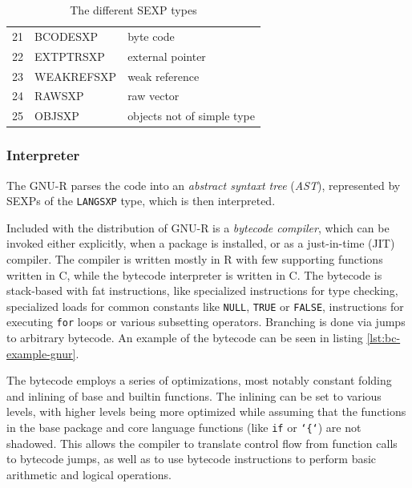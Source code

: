 \begin{table}[h!]
\begin{tabular}{c l l}
		21          & BCODESXP          & byte code                  \\
		22          & EXTPTRSXP         & external pointer           \\
		23          & WEAKREFSXP        & weak reference             \\
		24          & RAWSXP            & raw vector                 \\
		25          & OBJSXP            & objects not of simple type \\
		\hline
	\end{tabular}
	\caption{The different SEXP types\cite[1.1.1 SEXPTYPEs]{rprojectInternals}}\label{tbl:sexptype}
\end{table}

\subsubsection*{Interpreter}

The GNU-R parses the code into an \textit{abstract syntaxt tree} (\textit{AST}), represented by SEXPs of the \texttt{LANGSXP} type, which is then interpreted.

Included with the distribution of GNU-R is a \textit{bytecode compiler}, which can be invoked either explicitly, when a package is installed, or as a just-in-time (JIT) compiler. The compiler is written mostly in R with few supporting functions written in C, while the bytecode interpreter is written in C. The bytecode is stack-based with fat instructions, like specialized instructions for type checking, specialized loads for common constants like \texttt{NULL}, \texttt{TRUE} or \texttt{FALSE}, instructions for executing \texttt{for} loops or various subsetting operators. Branching is done via jumps to arbitrary bytecode. An example of the bytecode can be seen in listing \ref{lst:bc-example-gnur}.

The bytecode employs a series of optimizations, most notably constant folding and inlining of base and builtin functions. The inlining can be set to various levels, with higher levels being more optimized while assuming that the functions in the base package and core language functions (like \texttt{if} or \texttt{`\{`}) are not shadowed. This allows the compiler to translate control flow from function calls to bytecode jumps, as well as to use bytecode instructions to perform basic arithmetic and logical operations.

